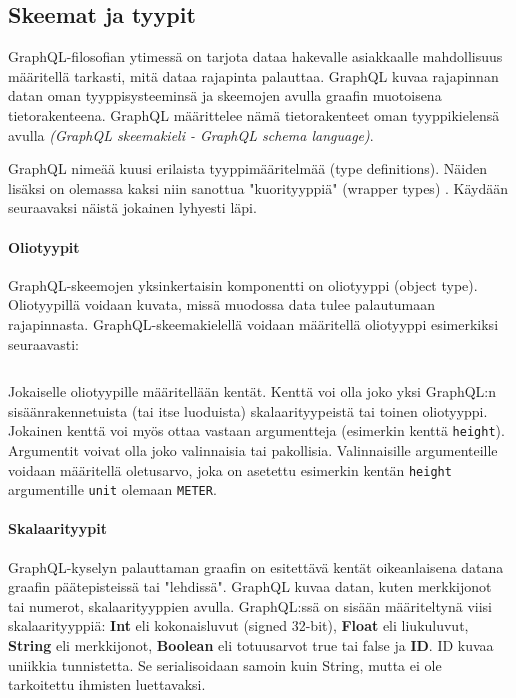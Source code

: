 \subsection{Skeemat ja tyypit}
\label{Skeemat ja tyypit}

GraphQL-filosofian ytimessä on tarjota dataa hakevalle asiakkaalle mahdollisuus määritellä tarkasti, mitä dataa rajapinta palauttaa. GraphQL kuvaa rajapinnan datan oman tyyppisysteeminsä ja skeemojen avulla graafin muotoisena tietorakenteena. GraphQL määrittelee nämä tietorakenteet oman tyyppikielensä avulla \textit{(GraphQL skeemakieli - GraphQL schema language)}. \cite{SchemasAndTypes} 

GraphQL nimeää kuusi erilaista tyyppimääritelmää (type definitions). Näiden lisäksi on olemassa kaksi niin sanottua "kuorityyppiä" (wrapper types) \cite{graphql-spec}. Käydään seuraavaksi näistä jokainen lyhyesti läpi. 

\paragraph{Oliotyypit} GraphQL-skeemojen yksinkertaisin komponentti on oliotyyppi (object type). Oliotyypillä voidaan kuvata, missä muodossa data tulee palautumaan rajapinnasta. GraphQL-skeemakielellä voidaan määritellä oliotyyppi esimerkiksi seuraavasti:

\inputminted{gql.py:GraphQLLexer -x}{listaukset/character.graphql}

Jokaiselle oliotyypille määritellään kentät. Kenttä voi olla joko yksi GraphQL:n sisäänrakennetuista (tai itse luoduista) skalaarityypeistä tai toinen oliotyyppi. Jokainen kenttä voi myös ottaa vastaan argumentteja (esimerkin kenttä \texttt{height}). Argumentit voivat olla joko valinnaisia tai pakollisia. Valinnaisille argumenteille voidaan määritellä oletusarvo, joka on asetettu esimerkin kentän \texttt{height} argumentille \texttt{unit} olemaan \texttt{METER}. \cite{SchemasAndTypes}

\paragraph{Skalaarityypit} GraphQL-kyselyn palauttaman graafin on esitettävä kentät oikeanlaisena datana graafin päätepisteissä tai "lehdissä". GraphQL kuvaa datan, kuten merkkijonot tai numerot, skalaarityyppien avulla. GraphQL:ssä on sisään määriteltynä viisi skalaarityyppiä: \textbf{Int} eli kokonaisluvut (signed 32-bit), \textbf{Float} eli liukuluvut, \textbf{String} eli merkkijonot, \textbf{Boolean} eli totuusarvot true tai false ja \textbf{ID}. ID kuvaa uniikkia tunnistetta. Se serialisoidaan samoin kuin String, mutta ei ole tarkoitettu ihmisten luettavaksi. \cite{SchemasAndTypes}

